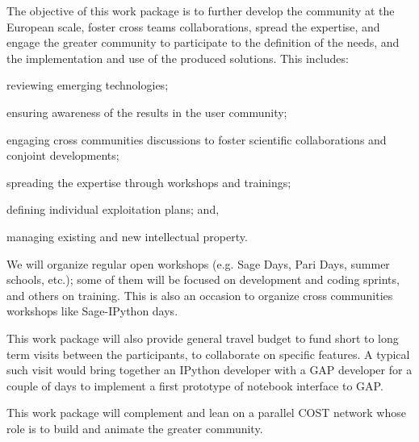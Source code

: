 \begin{workpackage}[id=dissem,wphases=18-48!.5,
  short={Community Building/Dissemination},
  title={Community Building, Training, Dissemination, Exploitation, and Outreach},
  lead=PS,
  PSRM=10, %
  SARM=18,
  USORM=10,
  USHRM=8,
  USRM=24,
  UVRM=2,
  UBRM=4,
  SRRM=1
]


\begin{wpobjectives}
  The objective of this work package is to further develop the community at the
  European scale, foster cross teams collaborations, spread the
  expertise, and engage the greater community to participate to the
  definition of the needs, and the implementation and use of the
  produced solutions. This includes:

  \begin{compactitem}
  \item reviewing emerging technologies;
  \item ensuring awareness of the results in the user community;
  \item engaging cross communities discussions to foster scientific collaborations and conjoint developments;
  \item spreading the expertise through workshops and trainings;
  \item defining individual exploitation plans; and,
  \item managing existing and new intellectual property.
  \end{compactitem}
\end{wpobjectives}

\begin{wpdescription} 
  We will organize regular open workshops (e.g. Sage Days, Pari Days,
  summer schools, etc.); some of them will be focused on development
  and coding sprints, and others on training. This is also an occasion
  to organize cross communities workshops like Sage-IPython days.


  This work package will also provide general travel budget to fund
  short to long term visits between the participants, to collaborate
  on specific features. A typical such visit would bring together an
  IPython developer with a GAP developer for a couple of days to
  implement a first prototype of notebook interface to GAP.

  This work package will complement and lean on a parallel COST
  network whose role is to build and animate the greater community.
\end{wpdescription}


\end{workpackage}
